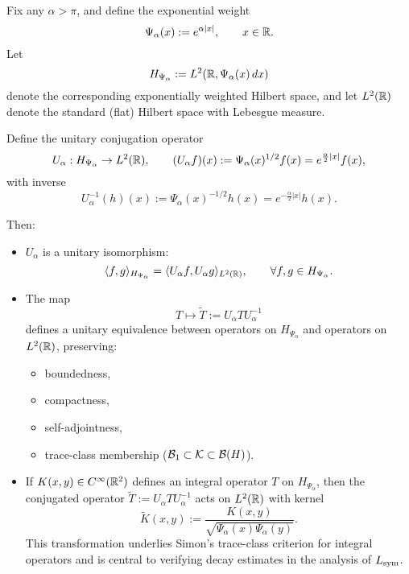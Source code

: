 \begin{definition}
\label{def:unitary_conjugation_operator}
Fix any \( \alpha > \pi \), and define the exponential weight
\[
\Psi_\alpha(x) := e^{\alpha |x|}, \qquad x \in \mathbb{R}.
\]
Let
\[
H_{\Psi_\alpha} := L^2(\mathbb{R}, \Psi_\alpha(x)\, dx)
\]
denote the corresponding exponentially weighted Hilbert space, and let \( L^2(\mathbb{R}) \) denote the standard (flat) Hilbert space with Lebesgue measure.

Define the unitary conjugation operator
\[
U_\alpha : H_{\Psi_\alpha} \to L^2(\mathbb{R}), \qquad (U_\alpha f)(x) := \Psi_\alpha(x)^{1/2} f(x) = e^{\frac{\alpha}{2}|x|} f(x),
\]
with inverse
\[
U_\alpha^{-1}(h)(x) := \Psi_\alpha(x)^{-1/2} h(x) = e^{-\frac{\alpha}{2}|x|} h(x).
\]

Then:
\begin{itemize}
    \item \( U_\alpha \) is a unitary isomorphism:
    \[
    \langle f, g \rangle_{H_{\Psi_\alpha}} = \langle U_\alpha f, U_\alpha g \rangle_{L^2(\mathbb{R})}, \qquad \forall f, g \in H_{\Psi_\alpha}.
    \]

    \item The map
    \[
    T \mapsto \widetilde{T} := U_\alpha T U_\alpha^{-1}
    \]
    defines a unitary equivalence between operators on \( H_{\Psi_\alpha} \) and operators on \( L^2(\mathbb{R}) \), preserving:
    \begin{itemize}
        \item boundedness,
        \item compactness,
        \item self-adjointness,
        \item trace-class membership (\( \mathcal{B}_1 \subset \mathcal{K} \subset \mathcal{B}(H) \)).
    \end{itemize}

    \item If \( K(x, y) \in C^\infty(\mathbb{R}^2) \) defines an integral operator \( T \) on \( H_{\Psi_\alpha} \), then the conjugated operator \( \widetilde{T} := U_\alpha T U_\alpha^{-1} \) acts on \( L^2(\mathbb{R}) \) with kernel
    \[
    \widetilde{K}(x, y) := \frac{K(x, y)}{\sqrt{\Psi_\alpha(x)\Psi_\alpha(y)}}.
    \]
    This transformation underlies Simon’s trace-class criterion for integral operators and is central to verifying decay estimates in the analysis of \( L_{\mathrm{sym}} \).
\end{itemize}
\end{definition}
